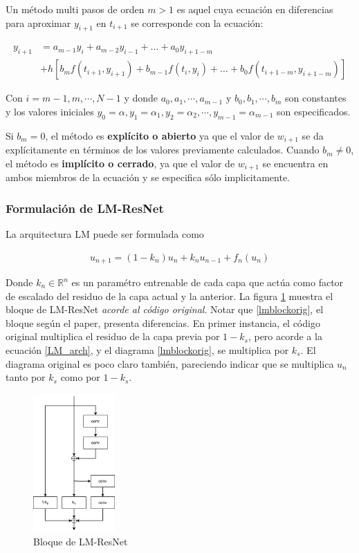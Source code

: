 \documentclass[titlepage,a4paper,oneside]{article}
\begin{document}
Un método multi pasos de orden $m > 1$ es aquel cuya ecuación en diferencias para aproximar $y_{i+1}$ en $t_{i+1}$ se corresponde con la ecuación:

\begin{align}
	y_{i+1} &= a_{m-1} y_i + a_{m-2} y_{i-1} + \ldots + a_0 y_{i+1-m} \\
	        &+ h \left[b_m f(t_{i+1}, y_{i+1}) + b_{m-1} f(t_i, y_i) + \ldots + b_0 f(t_{i+1-m}, y_{i+1-m})  \right]
\end{align}

Con $i=m-1, m, \cdots, N-1$ y donde $a_0, a_1, \cdots, a_{m-1}$ y $b_0, b_1, \cdots, b_m$ son constantes y los valores iniciales $y_0 = \alpha, y_1 = \alpha_1, y_2 = \alpha_2, \cdots, y_{m-1} = \alpha_{m-1}$ son especificados.

Si $b_m = 0$, el método es \textbf{explícito o abierto} ya que el valor de $w_{i+1}$ se da explícitamente en términos de los valores previamente calculados. Cuando $b_m \neq 0$, el método es \textbf{implícito o cerrado}, ya que el valor de $w_{i+1}$ se encuentra en ambos miembros de la ecuación y se especifica sólo implicitamente.

\subsubsection{Formulación de LM-ResNet}
La arquitectura LM puede ser formulada como

\begin{align}\label{LM_arch}
	u_{n+1} = (1-k_n) u_n + k_n u_{n-1} + f_n(u_n)
\end{align}

Donde $k_n \in \mathbb{R}^n$ es un paramétro entrenable de cada capa que actúa como factor de escalado del residuo de la capa actual y la anterior. La figura \ref{lmblock} muestra el bloque de LM-ResNet \textit{acorde al código original}. Notar que \ref{lmblockorig}, el bloque según el paper, presenta diferencias. En primer instancia, el código original multiplica el residuo de la capa previa por $1-k_s$, pero acorde a la ecuación \ref{LM_arch}, y el diagrama \ref{lmblockorig}, se multiplica por $k_s$. El diagrama original es poco claro también, pareciendo indicar que se multiplica $u_n$ tanto por $k_s$ como por $1-k_s$.

\begin{figure}[H]
\centering
\includegraphics[height=200px]{images/LM-Block.png}
\caption{Bloque de LM-ResNet}
\label{lmblock}
\end{figure}
\end{document}
